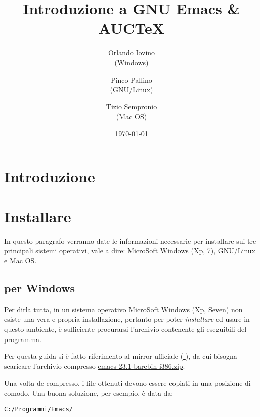 \documentclass[10pt,a4paper]{article}
\title{Introduzione a GNU Emacs \& AUCTeX}
\author{Orlando Iovino\\(Windows)
  \and Pinco Pallino\\(GNU/Linux)
  \and Tizio Sempronio\\(Mac OS)}
\date{\today}
\begin{document}
\maketitle
\begin{abstract}\sffamily
 \textcolor{red!50}{\lipsum[1]} 
\end{abstract}

\begin{multicols}{2}
  \tableofcontents
\end{multicols}

\section{Introduzione}
\label{sec:intro}


\section{Installare \emacs}
\label{sec:install}

In questo paragrafo verranno date le informazioni necessarie per installare
\emacs{} sui tre principali sistemi operativi, vale a dire: 
\textsf{MicroSoft Windows (Xp, 7)},
\textsf{GNU/Linux} e %
\textsf{Mac OS}.  %


\subsection*{\emacs{} per Windows}
\label{sec:installwin}
Per dirla tutta, in un sistema operativo MicroSoft Windows (Xp, Seven)
non esiste una vera e propria installazione, pertanto per poter
\emph{installare} ed usare \emacs{} in questo ambiente,
è sufficiente procurarsi l'archivio contenente gli eseguibili del programma.

Per questa guida si è fatto riferimento al mirror ufficiale
(\href{http://ftp.gnu.org/pub/gnu/emacs/windows/}{\mano{} \emacs}),
da cui bisogna scaricare l'archivio compresso
\href{http://ftp.gnu.org/pub/gnu/emacs/windows/emacs-23.1-barebin-i386.zip}
{\textsf{emacs-23.1-barebin-i386.zip}}.

Una volta de-compresso, i file ottenuti devono essere copiati in una
posizione di comodo. Una buona soluzione, per esempio, è data da:

\begin{verbatim}
C:/Programmi/Emacs/
\end{verbatim}
\end{document}
